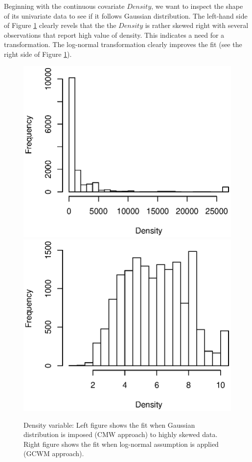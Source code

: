 \documentclass[12pt,letterpaper]{article}
\numberwithin{equation}{section}
\numberwithin{equation}{section}
\numberwithin{equation}{section}
\begin{document}
Beginning with the continuous covariate $Density$, we want to inspect the shape of its univariate data to see if it follows Gaussian distribution. %
The left-hand side of Figure \ref{fig:vet1} clearly revels that the the $Density$ is rather skewed right with several observations that report high value of density. This indicates a need for a transformation. The log-normal transformation clearly improves the fit (see the right side of Figure \ref{fig:vet1}).
\begin{figure}[!htb]
\begin{center}
\includegraphics[scale=0.63]{Untransformed_Density.eps}
\includegraphics[scale=0.63]{transformed_Density.eps}
\end{center}
\vspace{-0.2in}
\caption{Density variable: Left figure shows the fit when Gaussian distribution is imposed (CMW approach) to highly skewed data. Right figure shows the fit when log-normal assumption is applied (GCWM approach).}
\label{fig:vet1}
\end{figure}
\end{document}
